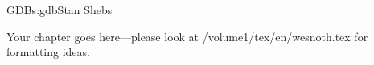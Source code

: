 \begin{aosachapter}{GDB}{s:gdb}{Stan Shebs}

Your chapter goes here---please look at /volume1/tex/en/wesnoth.tex for 
formatting ideas.

\end{aosachapter}
